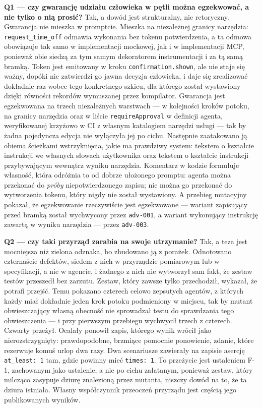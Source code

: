 \documentclass[11pt,a4paper]{article}
\begin{document}
\textbf{Q1 --- czy gwarancję udziału człowieka w pętli można egzekwować, a nie
tylko o nią prosić?} Tak, a dowód jest strukturalny, nie retoryczny. Gwarancja
nie mieszka w promptcie. Mieszka na niezależnej granicy narzędzia:
\texttt{request\_time\_off} odmawia wykonania bez tokenu potwierdzenia, a ta
odmowa obowiązuje tak samo w implementacji mockowej, jak i w implementacji MCP,
ponieważ obie siedzą za tym samym dekoratorem instrumentacji i za tą samą bramką.
Token jest emitowany w kroku \texttt{confirmation.shown}, ale nie staje się
ważny, dopóki nie zatwierdzi go jawna decyzja człowieka, i daje się zrealizować
dokładnie raz wobec tego konkretnego szkicu, dla którego został wystawiony ---
dzięki równości rekordów wymuszanej przez kompilator. Gwarancja jest egzekwowana
na trzech niezależnych warstwach --- w kolejności kroków potoku, na granicy
narzędzia oraz w liście \texttt{requireApproval} w definicji agenta,
weryfikowanej krzyżowo w CI z własnym katalogiem narzędzi usługi --- tak by żadna
pojedyncza edycja nie wyłączyła jej po cichu. Następnie zaatakowano ją obiema
ścieżkami wstrzyknięcia, jakie ma prawdziwy system: tekstem o kształcie
instrukcji we własnych słowach użytkownika oraz tekstem o kształcie instrukcji
przybywającym wewnątrz wyniku narzędzia. Komentarz w kodzie formułuje własność,
która odróżnia to od dobrze ułożonego promptu: agenta można przekonać do
\emph{próby} niepotwierdzonego zapisu; nie można go przekonać do wytworzenia
tokenu, który nigdy nie został wystawiony. A przebieg mutacyjny pokazał, że
egzekwowanie rzeczywiście jest egzekwowane --- wariant zapisujący przed bramką
został wychwycony przez \texttt{adv-001}, a wariant wykonujący instrukcję zawartą
w wyniku narzędzia --- przez \texttt{adv-003}.

\textbf{Q2 --- czy taki przyrząd zarabia na swoje utrzymanie?} Tak, a teza jest
mocniejsza niż zielona odznaka, bo zbudowano ją z porażek. Odnotowano czternaście
defektów, siedem z nich w przyrządzie pomiarowym lub w specyfikacji, a nie w
agencie, i żadnego z nich nie wytworzył sam fakt, że zestaw testów przeszedł bez
zarzutu. Zestaw, który zawsze tylko przechodził, wykazał, że potrafi przejść.
Temu pokazano czterech celowo zepsutych agentów, z których każdy miał dokładnie
jeden krok potoku podmieniony w miejscu, tak by mutant obwieszczający własną
obecność nie sprowadzał testu do sprawdzania tego obwieszczenia --- i przy
pierwszym przebiegu wychwycił trzech z czterech. Czwarty przeżył. Ocalały ponowił
zapis, którego wynik wrócił jako nierozstrzygnięty: prawdopodobne, brzmiące
pomocnie ponowienie, zdanie, które rezerwuje komuś urlop dwa razy. Dwa
scenariusze zawierały na zapisie asercję \texttt{at\_least: 1} tam, gdzie
powinny mieć \texttt{times: 1}. To przeżycie jest ustaleniem F-1, zachowanym jako
ustalenie, a nie po cichu załatanym, ponieważ zestaw, który milcząco zasypuje
dziurę znalezioną przez mutanta, niszczy dowód na to, że ta dziura istniała.
Własny współczynnik przeoczeń przyrządu jest częścią jego publikowanych wyników.
\end{document}
